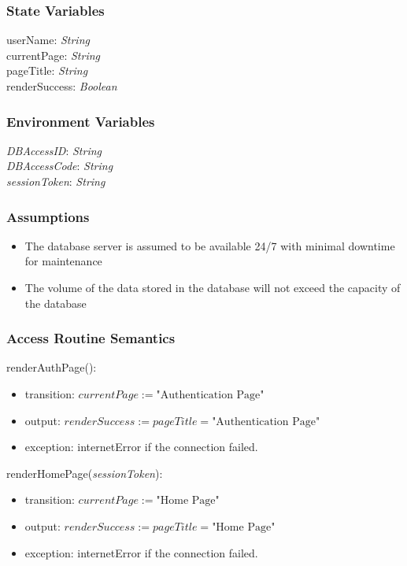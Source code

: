 \documentclass[12pt, titlepage]{article}
\begin{document}
\subsubsection{State Variables}


userName: \textit{String}\\
currentPage: \textit{String}\\
pageTitle: \textit{String}\\
renderSuccess: \textit{Boolean}\\


\subsubsection{Environment Variables}

\textit{DBAccessID}: \textit{String}\\ \textit{DBAccessCode}: \textit{String}\\
\textit{sessionToken}: \textit{String}

\subsubsection{Assumptions}

\begin{itemize}
  \item The database server is assumed to be available 24/7 with minimal downtime for maintenance 
  \item The volume of the data stored in the database will not exceed the capacity of the database
\end{itemize}

\subsubsection{Access Routine Semantics}

\noindent renderAuthPage():
\begin{itemize}
\item transition: \(currentPage := \text{"Authentication Page"}\)
\item output: \(renderSuccess := pageTitle = \text{"Authentication Page"}\)
\item exception: internetError if the connection failed.
\end{itemize}

\noindent renderHomePage(\textit{sessionToken}):
\begin{itemize}
\item transition: \(currentPage := \text{"Home Page"}\)
\item output: \(renderSuccess := pageTitle = \text{"Home Page"}\)
\item exception: internetError if the connection failed.
\end{itemize}
\end{document}

